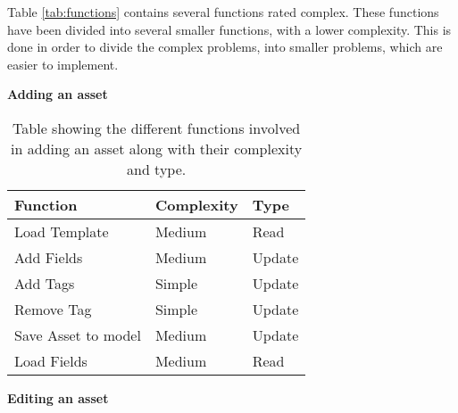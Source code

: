 \par

Table \ref{tab:functions} contains several functions rated complex. These functions have been divided into several smaller functions, with a lower complexity.
This is done in order to divide the complex problems, into smaller problems, which are easier to implement. 
 
\begin{center}
    \textbf{Adding an asset}
\end{center}

\begin{table}[H]
\centering
    \begin{tabular}{|l|l|l|}
        \hline
        \textbf{Function} & \textbf{Complexity} & \textbf{Type} \\
        \hline
        \hline
        Load Template & Medium & Read\\
        \hline
        Add Fields & Medium & Update\\
        \hline
        Add Tags & Simple & Update\\
        \hline
        Remove Tag & Simple & Update\\
        \hline
        Save Asset to model & Medium & Update\\
        \hline
        Load Fields & Medium & Read\\
        \hline
        
    \end{tabular}
\caption{Table showing the different functions involved in adding an asset along with their complexity and type.}\label{tab:AddAssetFunctions}
\end{table}

\par

\begin{center}
    \textbf{Editing an asset}
\end{center}

